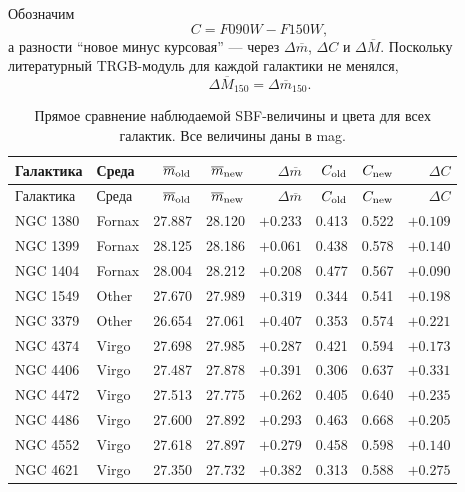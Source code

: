 \documentclass[12pt,a4paper]{article}
\begin{document}
Обозначим
\begin{equation}
    C = F090W-F150W,
\end{equation}
а разности ``новое минус курсовая'' --- через
\(\Delta\overline m\), \(\Delta C\) и
\(\Delta\overline M\). Поскольку литературный TRGB-модуль
для каждой галактики не менялся,
\begin{equation}
    \Delta\overline M_{150} =
    \Delta\overline m_{150}.
\end{equation}

\begin{landscape}
\scriptsize
\begin{longtable}{llrrrrrr}
\caption{Прямое сравнение наблюдаемой SBF-величины и цвета
для всех галактик. Все величины даны в mag.}
\label{tab:old_new_measurements}\\
\toprule
Галактика & Среда &
\(\overline m_{\rm old}\) &
\(\overline m_{\rm new}\) &
\(\Delta\overline m\) &
\(C_{\rm old}\) &
\(C_{\rm new}\) &
\(\Delta C\) \\
\midrule
\endfirsthead
\toprule
Галактика & Среда &
\(\overline m_{\rm old}\) &
\(\overline m_{\rm new}\) &
\(\Delta\overline m\) &
\(C_{\rm old}\) &
\(C_{\rm new}\) &
\(\Delta C\) \\
\midrule
\endhead
\bottomrule
\endfoot
NGC 1380 & Fornax & 27.887 & 28.120 & \(+0.233\) & 0.413 & 0.522 & \(+0.109\) \\
NGC 1399 & Fornax & 28.125 & 28.186 & \(+0.061\) & 0.438 & 0.578 & \(+0.140\) \\
NGC 1404 & Fornax & 28.004 & 28.212 & \(+0.208\) & 0.477 & 0.567 & \(+0.090\) \\
NGC 1549 & Other  & 27.670 & 27.989 & \(+0.319\) & 0.344 & 0.541 & \(+0.198\) \\
NGC 3379 & Other  & 26.654 & 27.061 & \(+0.407\) & 0.353 & 0.574 & \(+0.221\) \\
NGC 4374 & Virgo  & 27.698 & 27.985 & \(+0.287\) & 0.421 & 0.594 & \(+0.173\) \\
NGC 4406 & Virgo  & 27.487 & 27.878 & \(+0.391\) & 0.306 & 0.637 & \(+0.331\) \\
NGC 4472 & Virgo  & 27.513 & 27.775 & \(+0.262\) & 0.405 & 0.640 & \(+0.235\) \\
NGC 4486 & Virgo  & 27.600 & 27.892 & \(+0.293\) & 0.463 & 0.668 & \(+0.205\) \\
NGC 4552 & Virgo  & 27.618 & 27.897 & \(+0.279\) & 0.458 & 0.598 & \(+0.140\) \\
NGC 4621 & Virgo  & 27.350 & 27.732 & \(+0.382\) & 0.313 & 0.588 & \(+0.275\) \\

\end{longtable}
\end{landscape}
\end{document}
